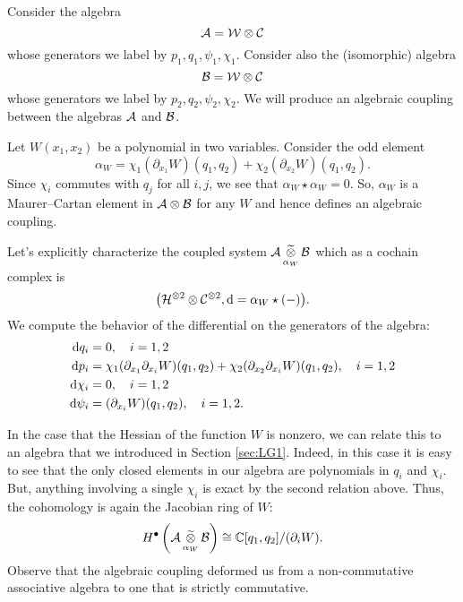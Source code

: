 \documentclass[11pt]{amsart}
\def\natalie#1{{\textcolor{green!65!black}{NMP: {#1}}}}
\begin{document}
Consider the algebra 
\[
\mathcal A = \mathcal W \otimes \mathcal C 
\]
whose generators we label by $p_1,q_1,\psi_1,\chi_1$.
Consider also the (isomorphic) algebra
\[
\mathcal B = \mathcal W \otimes \mathcal C
\]
whose generators we label by $p_2,q_2,\psi_2,\chi_2$.
We will produce an algebraic coupling between the algebras $\mathcal A$ and $\mathcal B$. 

Let $W(x_1,x_2)$ be a polynomial in two variables. 
Consider the odd element 
\[
\alpha_W = \chi_1 (\partial_{x_1} W)(q_1,q_2) + \chi_2 (\partial_{x_2} W)(q_1,q_2) .
\]
Since $\chi_i$ commutes with $q_j$ for all $i,j$, we see that $\alpha_W \star \alpha_W = 0$.
So, $\alpha_W$ is a Maurer--Cartan element in $\mathcal A \otimes \mathcal B$ for any $W$ and hence defines an algebraic coupling. 

Let's explicitly characterize the coupled system $\mathcal A \, \underset{\alpha_W}{\widetilde{\otimes}} \, \mathcal B$ which as a cochain complex is 
\[
\big(\mathcal H^{\otimes 2} \otimes \mathcal C^{\otimes 2} , {\rm d} = \alpha_W \star (-) \big) .
\]
We compute the behavior of the differential on the generators of the algebra: 
\begin{align*}
{\rm d} q_i & = 0 , \quad i=1,2 \\
{\rm d} p_i & = \chi_1 (\partial_{x_1} \partial_{x_i} W)(q_1,q_2) + \chi_2 (\partial_{x_2} \partial_{x_i} W)(q_1,q_2) , \quad i = 1,2 \\
{\rm d} \chi_i & = 0, \quad i=1,2 \\
{\rm d} \psi_i & = (\partial_{x_i} W)(q_1,q_2), \quad i=1,2 . 
\end{align*}

In the case that the Hessian of the function $W$ is nonzero, we can relate this to an algebra that we introduced in Section \ref{sec:LG1}. 
Indeed, in this case it is easy to see that the only closed elements in our algebra are polynomials in $q_i$ and $\chi_i$. 
But, anything involving a single $\chi_i$ is exact by the second relation above. 
Thus, the cohomology is again the Jacobian ring of $W$:
\[
H^\bullet \left(\mathcal A \, \underset{\alpha_W}{\widetilde{\otimes}} \, \mathcal B\right) \cong \mathbb C[q_1,q_2] / (\partial_i W)  .
\]
Observe that the algebraic coupling deformed us from a non-commutative associative algebra to one that is strictly commutative. 
%
\end{document}
